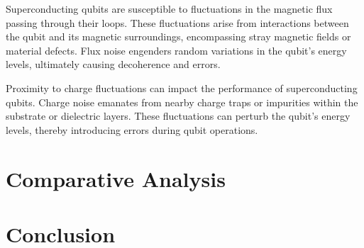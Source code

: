 \documentclass[
  journal=largetwo,
  year=2023,
]{cup-journal}
\begin{document}
Superconducting qubits are susceptible to fluctuations in the magnetic flux passing through their loops. These fluctuations arise from interactions between the qubit and its magnetic surroundings, encompassing stray magnetic fields or material defects. Flux noise engenders random variations in the qubit's energy levels, ultimately causing decoherence and errors.

Proximity to charge fluctuations can impact the performance of superconducting qubits. Charge noise emanates from nearby charge traps or impurities within the substrate or dielectric layers. These fluctuations can perturb the qubit's energy levels, thereby introducing errors during qubit operations.

\section{Comparative Analysis}

\section{Conclusion}

\printendnotes

\printbibliography

\appendix


\end{document}
